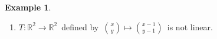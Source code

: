 \documentclass[11pt,a4paper]{article}
\theoremstyle{definition}
\newtheorem{exa}[thm]{Example}
\begin{document}
\begin{exa}
\begin{enumerate}
\begin{enumerate}
\item[(ii)] for $\, \lambda\in \mathbb{R}$, we have $T(\lambda \, a) = T\begin{pmatrix}
\lambda\, x_1\\
\lambda\, y_1\\
\end{pmatrix} = \begin{pmatrix}
\lambda\, x_1\\
\lambda\, x_1\\
\end{pmatrix} = \lambda \begin{pmatrix}
x_1\\
x_1\\
\end{pmatrix} = \lambda \, T\begin{pmatrix}
x_1\\
y_1\\
\end{pmatrix} = \lambda \, T(a)$\\

$\therefore\, T$ as defined is linear.\\\\
\end{enumerate}



\item $T : \mathbb{R}^2 \longrightarrow \mathbb{R}^2\,$ defined by $\, \displaystyle{\binom{x}{y} \longmapsto \binom{x - 1}{y - 1}}\,$ is not linear.\\\\



\end{enumerate}
\end{exa}
\end{document}
